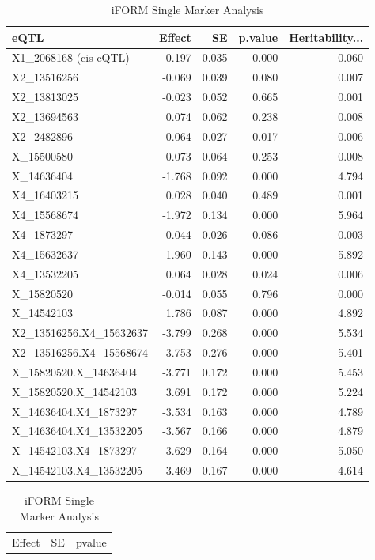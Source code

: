 \documentclass[11pt,]{book}
\theoremstyle{definition}
\theoremstyle{definition}
\theoremstyle{remark}
\begin{document}
\begin{table}
\caption{\label{tab:OutputTable}iFORM         Single Marker Analysis}

\centering
\begin{tabular}[t]{lrrrr}
\toprule
eQTL & Effect & SE & p.value & Heritability...\\
\midrule
X1\_2068168 (cis-eQTL) & -0.197 & 0.035 & 0.000 & 0.060\\
X2\_13516256 & -0.069 & 0.039 & 0.080 & 0.007\\
X2\_13813025 & -0.023 & 0.052 & 0.665 & 0.001\\
X2\_13694563 & 0.074 & 0.062 & 0.238 & 0.008\\
X2\_2482896 & 0.064 & 0.027 & 0.017 & 0.006\\
\addlinespace
X\_15500580 & 0.073 & 0.064 & 0.253 & 0.008\\
X\_14636404 & -1.768 & 0.092 & 0.000 & 4.794\\
X4\_16403215 & 0.028 & 0.040 & 0.489 & 0.001\\
X4\_15568674 & -1.972 & 0.134 & 0.000 & 5.964\\
X4\_1873297 & 0.044 & 0.026 & 0.086 & 0.003\\
\addlinespace
X4\_15632637 & 1.960 & 0.143 & 0.000 & 5.892\\
X4\_13532205 & 0.064 & 0.028 & 0.024 & 0.006\\
X\_15820520 & -0.014 & 0.055 & 0.796 & 0.000\\
X\_14542103 & 1.786 & 0.087 & 0.000 & 4.892\\
X2\_13516256.X4\_15632637 & -3.799 & 0.268 & 0.000 & 5.534\\
\addlinespace
X2\_13516256.X4\_15568674 & 3.753 & 0.276 & 0.000 & 5.401\\
X\_15820520.X\_14636404 & -3.771 & 0.172 & 0.000 & 5.453\\
X\_15820520.X\_14542103 & 3.691 & 0.172 & 0.000 & 5.224\\
X\_14636404.X4\_1873297 & -3.534 & 0.163 & 0.000 & 4.789\\
X\_14636404.X4\_13532205 & -3.567 & 0.166 & 0.000 & 4.879\\
\addlinespace
X\_14542103.X4\_1873297 & 3.629 & 0.164 & 0.000 & 5.050\\
X\_14542103.X4\_13532205 & 3.469 & 0.167 & 0.000 & 4.614\\
\bottomrule
\end{tabular}
\centering
\begin{tabular}[t]{rrr}
\toprule
Effect & SE & pvalue\\

\end{tabular}
\end{table}
\end{document}
